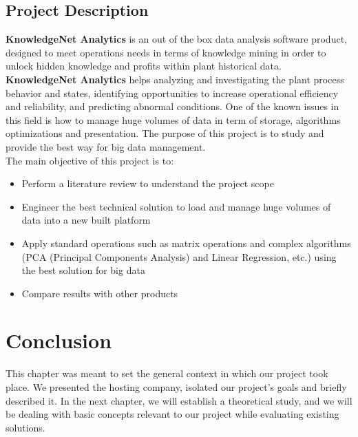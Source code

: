 \subsection{Project Description}

\textbf{KnowledgeNet Analytics} is an out of the box data analysis software product, designed to meet operations needs in terms of knowledge mining in order to unlock hidden knowledge and profits within plant historical data. \textbf{KnowledgeNet Analytics} helps analyzing and investigating the plant process behavior and states, identifying opportunities to increase operational efficiency and reliability, and predicting abnormal conditions. One of the known issues in this field is how to manage huge volumes of data in term of storage, algorithms optimizations and presentation. The purpose of this project is to study and provide the best way for big data management.\\

The main objective of this project is to:
\begin{itemize}
\item Perform a literature review to understand the project scope
\item Engineer the best technical solution to load and manage huge volumes of data into a new built platform
\item Apply standard operations such as matrix operations and complex algorithms (PCA (Principal Components Analysis) and Linear Regression, etc.) using the best solution for big data
\item Compare results with other products
\end{itemize}
\section*{Conclusion}
This chapter was meant to set the general context in which our project took place. We presented the hosting company, isolated our project's goals and briefly described it. In the next chapter, we will establish a theoretical study, and we will be dealing with basic concepts relevant to our project while evaluating existing solutions.